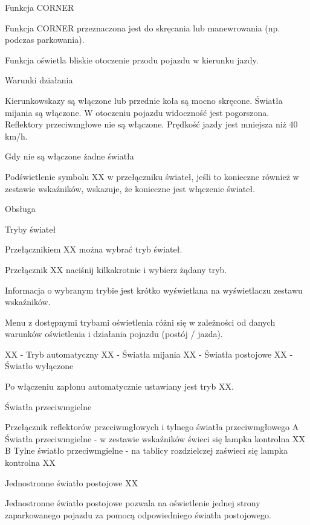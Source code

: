 Funkcja CORNER

Funkcja CORNER przeznaczona jest do skręcania lub manewrowania (np. podczas parkowania).

Funkcja oświetla bliskie otoczenie przodu pojazdu w kierunku jazdy.

Warunki działania
\begin{itemizeTick}
	\itemTick Kierunkowskazy są włączone lub przednie koła są mocno skręcone.
	\itemTick Światła mijania są włączone.
	\itemTick W otoczeniu pojazdu widoczność jest pogorszona.
	\itemTick Reflektory przeciwmgłowe nie są włączone.
	\itemTick Prędkość jazdy jest mniejsza niż 40 km/h.
\end{itemizeTick}

Gdy nie są włączone żadne światła

Podświetlenie symbolu XX w przełączniku świateł, jeśli to konieczne również w zestawie wskaźników, wskazuje, że konieczne jest włączenie świateł.

Obsługa

Tryby świateł


Przełącznikiem XX można wybrać tryb świateł.

\begin{itemizeArrow}
	\itemArrow Przełącznik XX naciśnij kilkakrotnie i wybierz żądany tryb.
\end{itemizeArrow}

Informacja o wybranym trybie jest krótko wyświetlana na wyświetlaczu zestawu wskaźników.

Menu z dostępnymi trybami oświetlenia różni się w zależności od danych warunków oświetlenia i działania pojazdu (postój / jazda).

XX - Tryb automatyczny
XX - Światła mijania
XX - Światła postojowe
XX - Światło wyłączone

Po włączeniu zapłonu automatycznie ustawiany jest tryb XX.

Światła przeciwmgielne

Przełącznik reflektorów przeciwmgłowych i tylnego światła przeciwmgłowego
A Światła przeciwmgielne - w zestawie wskaźników świeci się lampka kontrolna XX
B Tylne światło przeciwmgielne - na tablicy rozdzielczej zaświeci się lampka kontrolna XX

Jednostronne światło postojowe XX

Jednostronne światło postojowe pozwala na oświetlenie jednej strony zaparkowanego pojazdu za pomocą odpowiedniego światła postojowego.

